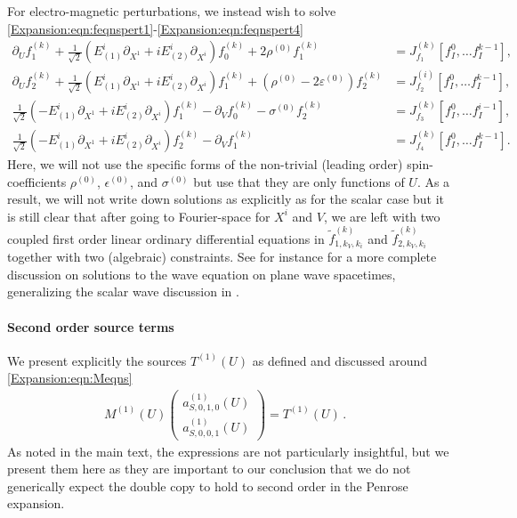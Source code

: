 	For electro-magnetic perturbations, we instead wish to solve \eqref{Expansion:eqn:feqnspert1}-\eqref{Expansion:eqn:feqnspert4}
	\begin{align}
	\partial_U f^{(k)}_{1} + \frac{1}{\sqrt{2}}(E^i_{(1)}\partial_{X^1}+i E^i_{(2)} \partial_{X^i}) f^{(k)}_{0} + 2 \rho^{(0)} f^{(k)}_{1} &=  J^{(k)}_{f_1}[f^{0}_I, \ldots f^{k-1}_I],  \\
	\partial_U f^{(k)}_{2}+ \frac{1}{\sqrt{2}}(E^i_{(1)}\partial_{X^1}+i E^i_{(2)} \partial_{X^i}) f^{(k)}_{1} +  \left(\rho^{(0)} - 2 \varepsilon^{(0)}\right) f^{(k)}_{2} &= J^{(i)}_{f_2}[f^{0}_I, \ldots f^{k-1}_I],  \\
	\frac{1}{\sqrt{2}}(-E^i_{(1)}\partial_{X^1}+i E^i_{(2)} \partial_{X^i}) f^{(k)}_{1} - \partial_V f^{(k)}_{0}- \sigma^{(0)} f^{(k)}_{2}&=  J^{(k)}_{f_3}[f^{0}_I, \ldots f^{i-1}_I],  \\
	\frac{1}{\sqrt{2}}(-E^i_{(1)}\partial_{X^1}+i E^i_{(2)} \partial_{X^i}) f^{(k)}_{2} - \partial_V f^{(k)}_{1} &=   J^{(k)}_{f_4}[f^{0}_I, \ldots f^{k-1}_I] . 
	\end{align}
	Here, we will not use the specific forms of the non-trivial (leading order) spin-coefficients $\rho^{(0)}$, $\epsilon^{(0)}$, and $\sigma^{(0)}$ but use that they are only functions of $U$. As a result, we will not write down solutions as explicitly as for the scalar case but it is still clear that after going to Fourier-space for $X^i$ and $V$, we are left with two  coupled first order linear ordinary differential equations in $\tilde{f}^{(k)}_{1,k_V,k_i}$ and $\tilde{f}^{(k)}_{2,k_V,k_i}$ together with two (algebraic) constraints. See for instance \cite{mason1989ward} for a more complete discussion on solutions to the wave equation on plane wave spacetimes, generalizing the scalar wave discussion in \cite{Ward:1987ws}.
	
	\paragraph*{Second order source terms}
	
	We present explicitly the sources $T^{(1)}(U)$ as defined and discussed around \eqref{Expansion:eqn:Meqns}
	\begin{equation}\label{Expansion:eqn:app:Meqns}
	\begin{aligned}
	M^{(1)}(U)\begin{pmatrix}
	a^{(1)}_{S,0, 1,0}(U) \\ a^{(1)}_{S,0, 0,1}(U) 
	\end{pmatrix} = T^{(1)}(U)  \, . \quad	
	\end{aligned}
	\end{equation}
	As noted in the main text, the expressions are not particularly insightful, but we present them here as they are important to our conclusion that we do not generically expect the double copy to hold to second order in the Penrose expansion.
	
